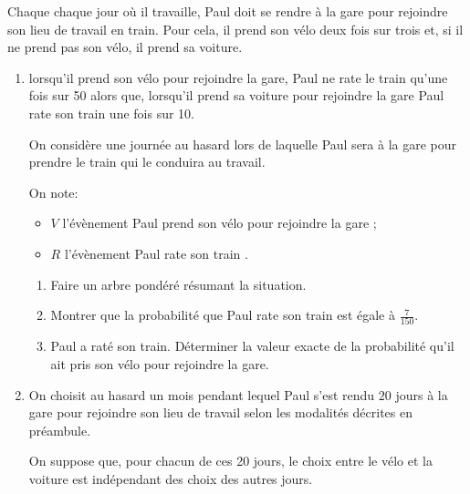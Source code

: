Chaque chaque jour où il travaille, Paul doit se rendre à la gare pour rejoindre son lieu de travail en train. Pour cela, il prend son vélo deux fois sur trois et, si il ne prend pas son vélo, il prend sa voiture.

\begin{enumerate}
	\item lorsqu'il prend son vélo pour rejoindre la gare, Paul ne rate le train qu'une fois sur 50 alors que, lorsqu'il prend sa voiture pour rejoindre la gare Paul rate son train une fois sur 10.
	
	On considère une journée au hasard lors de laquelle Paul sera à la gare pour prendre le train qui le conduira au travail.
	
	On note:
	
	\begin{itemize}
		\item $V$ l'évènement \og Paul prend son vélo pour rejoindre la gare \fg{} ; 
		\item $R$ l'évènement \og Paul rate son train \fg.
	\end{itemize}
	
	\begin{enumerate}
		\item Faire un arbre pondéré résumant la situation.
		\item Montrer que la probabilité que Paul rate son train est égale à $\frac{7}{150}$.
		\item Paul a raté son train. Déterminer la valeur exacte de la probabilité qu'il ait pris son vélo pour rejoindre la gare.
	\end{enumerate}
	\item On choisit au hasard un mois pendant lequel Paul s'est rendu $20$ jours à la gare pour rejoindre son lieu de travail selon les modalités décrites en préambule. 
	
	On suppose que, pour chacun de ces 20 jours, le choix entre le vélo et
	la voiture est indépendant des choix des autres jours.
	

\end{enumerate}
